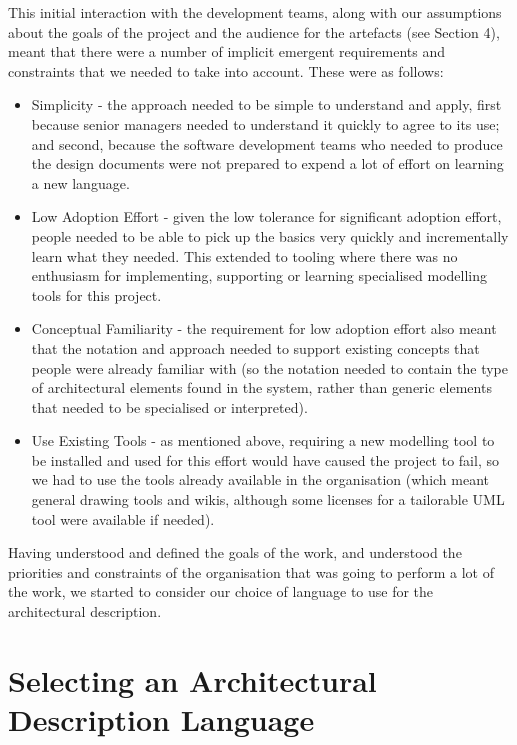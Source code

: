 This initial interaction with the development teams, along with our assumptions about the goals of the project and the audience for the artefacts (see Section 4), meant that there were a number of implicit emergent requirements and constraints that we needed to take into account.  These were as follows:

\begin{itemize}

  \item Simplicity - the approach needed to be simple to understand and apply, first because senior managers needed to understand it quickly to agree to its use; and second, because the software development teams who needed to produce the design documents were not prepared to expend a lot of effort on learning a new language.

  \item Low Adoption Effort - given the low tolerance for significant adoption effort, people needed to be able to pick up the basics very quickly and incrementally learn what they needed.  This extended to tooling where there was no enthusiasm for implementing, supporting or learning specialised modelling tools for this project.

  \item Conceptual Familiarity - the requirement for low adoption effort also meant that the notation and approach needed to support existing concepts that people were already familiar with (so the notation needed to contain the type of architectural elements found in the system, rather than generic elements that needed to be specialised or interpreted).

  \item Use Existing Tools - as mentioned above, requiring a new modelling tool to be installed and used for this effort would have caused the project to fail, so we had to use the tools already available in the organisation (which meant general drawing tools and wikis, although some licenses for a tailorable UML tool were available if needed).

\end{itemize}

Having understood and defined the goals of the work, and understood the priorities and constraints of the organisation that was going to perform a lot of the work, we started to consider our choice of language to use for the architectural description.

\section{Selecting an Architectural Description Language}

